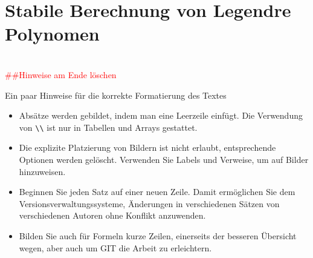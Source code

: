 %
%
%

\newcommand{\cmt}[1]{{~\\\textcolor{red}{\#\##1}}}

\chapter{Stabile Berechnung von Legendre Polynomen\label{chapter:legendre}}
\begin{refsection}

\cmt{Hinweise am Ende löschen}

Ein paar Hinweise für die korrekte Formatierung des Textes
\begin{itemize}
\item
Absätze werden gebildet, indem man eine Leerzeile einfügt.
Die Verwendung von \verb+\\+ ist nur in Tabellen und Arrays gestattet.
\item
Die explizite Platzierung von Bildern ist nicht erlaubt, entsprechende
Optionen werden gelöscht. 
Verwenden Sie Labels und Verweise, um auf Bilder hinzuweisen.
\item
Beginnen Sie jeden Satz auf einer neuen Zeile. 
Damit ermöglichen Sie dem Versionsverwaltungssysteme, Änderungen
in verschiedenen Sätzen von verschiedenen Autoren ohne Konflikt 
anzuwenden.
\item 
Bilden Sie auch für Formeln kurze Zeilen, einerseits der besseren
Übersicht wegen, aber auch um GIT die Arbeit zu erleichtern.
\end{itemize}






\printbibliography[heading=subbibliography]
\end{refsection}
